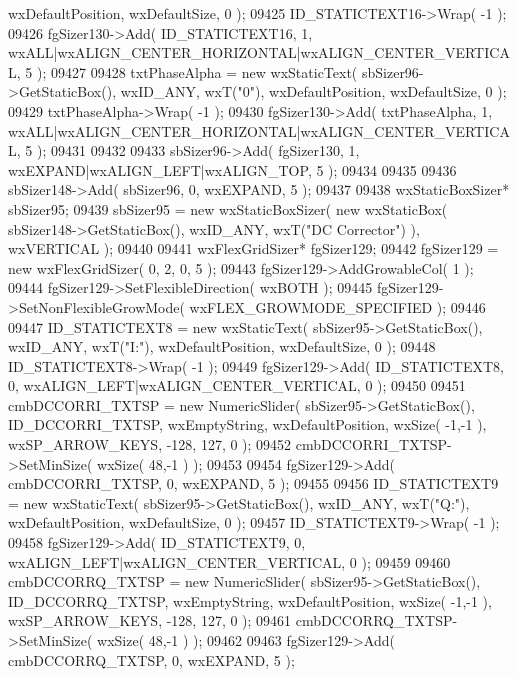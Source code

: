 \begin{DoxyCode}
      wxDefaultPosition, wxDefaultSize, 0 );
09425     ID_STATICTEXT16->Wrap( -1 );
09426     fgSizer130->Add( ID_STATICTEXT16, 1, wxALL|wxALIGN\_CENTER\_HORIZONTAL|wxALIGN\_CENTER\_VERTICAL, 5 );
09427     
09428     txtPhaseAlpha = \textcolor{keyword}{new} wxStaticText( sbSizer96->GetStaticBox(), wxID\_ANY, wxT(\textcolor{stringliteral}{"0"}), wxDefaultPosition, 
      wxDefaultSize, 0 );
09429     txtPhaseAlpha->Wrap( -1 );
09430     fgSizer130->Add( txtPhaseAlpha, 1, wxALL|wxALIGN\_CENTER\_HORIZONTAL|wxALIGN\_CENTER\_VERTICAL, 5 );
09431     
09432     
09433     sbSizer96->Add( fgSizer130, 1, wxEXPAND|wxALIGN\_LEFT|wxALIGN\_TOP, 5 );
09434     
09435     
09436     sbSizer148->Add( sbSizer96, 0, wxEXPAND, 5 );
09437     
09438     wxStaticBoxSizer* sbSizer95;
09439     sbSizer95 = \textcolor{keyword}{new} wxStaticBoxSizer( \textcolor{keyword}{new} wxStaticBox( sbSizer148->GetStaticBox(), wxID\_ANY, wxT(\textcolor{stringliteral}{"DC
       Corrector"}) ), wxVERTICAL );
09440     
09441     wxFlexGridSizer* fgSizer129;
09442     fgSizer129 = \textcolor{keyword}{new} wxFlexGridSizer( 0, 2, 0, 5 );
09443     fgSizer129->AddGrowableCol( 1 );
09444     fgSizer129->SetFlexibleDirection( wxBOTH );
09445     fgSizer129->SetNonFlexibleGrowMode( wxFLEX\_GROWMODE\_SPECIFIED );
09446     
09447     ID_STATICTEXT8 = \textcolor{keyword}{new} wxStaticText( sbSizer95->GetStaticBox(), wxID\_ANY, wxT(\textcolor{stringliteral}{"I:"}), wxDefaultPosition, 
      wxDefaultSize, 0 );
09448     ID_STATICTEXT8->Wrap( -1 );
09449     fgSizer129->Add( ID_STATICTEXT8, 0, wxALIGN\_LEFT|wxALIGN\_CENTER\_VERTICAL, 0 );
09450     
09451     cmbDCCORRI_TXTSP = \textcolor{keyword}{new} NumericSlider( sbSizer95->GetStaticBox(), 
      ID_DCCORRI_TXTSP, wxEmptyString, wxDefaultPosition, wxSize( -1,-1 ), wxSP\_ARROW\_KEYS, -128, 127, 0 );
09452     cmbDCCORRI_TXTSP->SetMinSize( wxSize( 48,-1 ) );
09453     
09454     fgSizer129->Add( cmbDCCORRI_TXTSP, 0, wxEXPAND, 5 );
09455     
09456     ID_STATICTEXT9 = \textcolor{keyword}{new} wxStaticText( sbSizer95->GetStaticBox(), wxID\_ANY, wxT(\textcolor{stringliteral}{"Q:"}), wxDefaultPosition, 
      wxDefaultSize, 0 );
09457     ID_STATICTEXT9->Wrap( -1 );
09458     fgSizer129->Add( ID_STATICTEXT9, 0, wxALIGN\_LEFT|wxALIGN\_CENTER\_VERTICAL, 0 );
09459     
09460     cmbDCCORRQ_TXTSP = \textcolor{keyword}{new} NumericSlider( sbSizer95->GetStaticBox(), 
      ID_DCCORRQ_TXTSP, wxEmptyString, wxDefaultPosition, wxSize( -1,-1 ), wxSP\_ARROW\_KEYS, -128, 127, 0 );
09461     cmbDCCORRQ_TXTSP->SetMinSize( wxSize( 48,-1 ) );
09462     
09463     fgSizer129->Add( cmbDCCORRQ_TXTSP, 0, wxEXPAND, 5 );

\end{DoxyCode}

